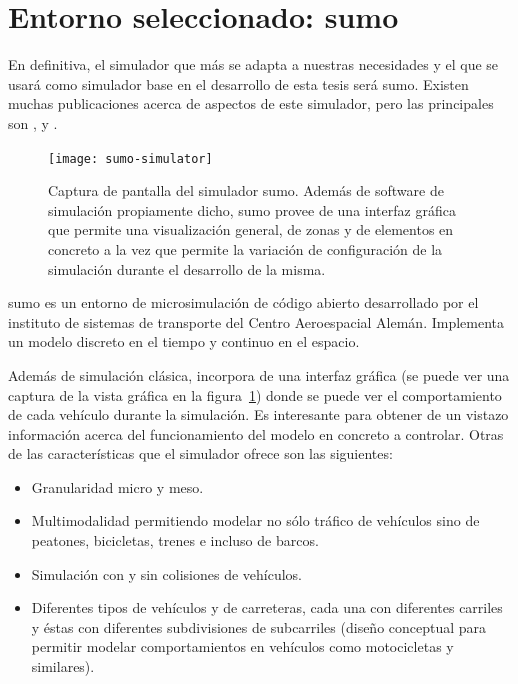 \section{Entorno seleccionado: \gls{sumo}}

En definitiva, el simulador que más se adapta a nuestras necesidades y el que se usará como simulador base en el desarrollo de esta tesis será \gls{sumo}. Existen muchas publicaciones acerca de aspectos de este simulador, pero las principales son \cite{krajzewicz2002sumo}, \cite{behrisch2011sumo} y \cite{krajzewicz2012recent}.

\begin{figure}
	\texttt{[image: sumo-simulator]}
	\caption{Captura de pantalla del simulador \gls{sumo}. Además de software de simulación propiamente dicho, \gls{sumo} provee de una interfaz gráfica que permite una visualización general, de zonas y de elementos en concreto a la vez que permite la variación de configuración de la simulación durante el desarrollo de la misma.}
	\label{fig:sumo-simulator}
\end{figure}

\gls{sumo} es un entorno de microsimulación de código abierto desarrollado por el instituto de sistemas de transporte del Centro Aeroespacial Alemán. Implementa un modelo discreto en el tiempo y continuo en el espacio.

Además de simulación clásica, incorpora de una interfaz gráfica (se puede ver una captura de la vista gráfica en la figura~\ref{fig:sumo-simulator}) donde se puede ver el comportamiento de cada vehículo durante la simulación. Es interesante para obtener de un vistazo información acerca del funcionamiento del modelo en concreto a controlar. Otras de las características que el simulador ofrece son las siguientes:

\begin{itemize}
	\item Granularidad micro y meso.
	\item Multimodalidad permitiendo modelar no sólo tráfico de vehículos sino de peatones, bicicletas, trenes e incluso de barcos.
	\item Simulación con y sin colisiones de vehículos.
	\item Diferentes tipos de vehículos y de carreteras, cada una con diferentes carriles y éstas con diferentes subdivisiones de subcarriles (diseño conceptual para permitir modelar comportamientos en vehículos como motocicletas y similares).
\end{itemize}

